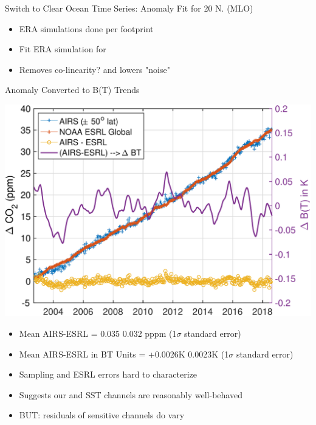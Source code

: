 \documentclass[10pt,t]{beamer}
\begin{document}
\begin{frame}[label={sec:orgc9dcc68}]{\small Switch to Clear Ocean Time Series: \cd Anomaly Fit for 20\textdegree{} N. (MLO)}
\begin{footnotesize}
\begin{itemize}
\item ERA simulations done per footprint
\item Fit ERA simulation for \cd
\item Removes co-linearity? and lowers "noise"
\end{itemize}
\end{footnotesize}
\end{frame}

\begin{frame}[label={sec:orgcc0ebe8}]{\cd Anomaly Converted to B(T) Trends}
\begin{center}
\includegraphics[width=0.7\linewidth]{./Figs/Pdf/co2_airs_vs_esrl_global_with_dbt.pdf}
\end{center}

\vspace{-0.1in}
\begin{footnotesize}
\begin{itemize}
\item Mean AIRS-ESRL \cd = 0.035 \textpm{} 0.032  pppm (1\(\sigma\) standard error)
\item Mean AIRS-ESRL in BT Units = +0.0026K \textpm{} 0.0023K (1\(\sigma\) standard error)
\item Sampling and ESRL errors hard to characterize
\item Suggests our \cd and SST channels are reasonably well-behaved
\item BUT: residuals of \cd sensitive channels do vary
\end{itemize}
\end{footnotesize}
\end{frame}
\end{document}

